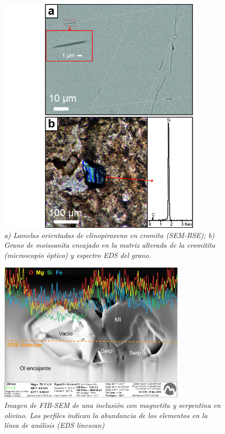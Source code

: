 \documentclass[a4paper,11pt]{article}
\begin{document}
	\begin{figure}[h]
		\centering
		\includegraphics[width=100mm]{Figura2.jpg}
		\caption{\sl a) Lamelas orientadas de clinopiroxeno en cromita (SEM-BSE); b) Grano de moissanita encajado en la matriz alterada de la cromitita (microscopio óptico) y espectro EDS del grano.}
		\label{Fig2}
	\end{figure}
	\begin{figure}[h]
		\centering
		\includegraphics[width=90mm]{Figura3.jpg}
		\caption{\sl Imagen de FIB-SEM de una inclusión con magnetita y serpentina en olivino. Los perfiles indican la abundancia de los elementos en la línea de análisis (EDS linescan)}
		\label{Fig3}
	\end{figure}
		
\end{document}
